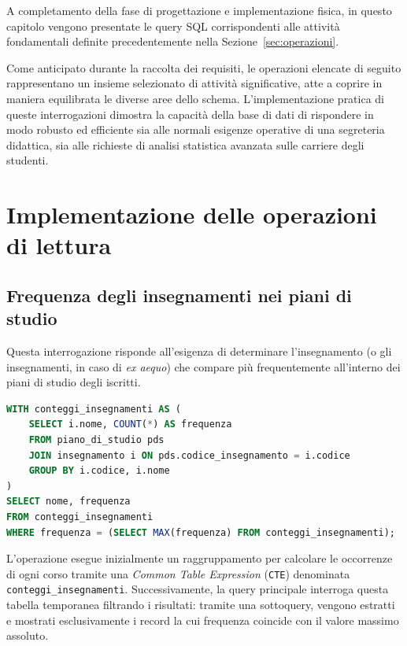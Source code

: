 A completamento della fase di progettazione e implementazione fisica, in questo capitolo vengono presentate le query SQL corrispondenti alle attività fondamentali definite precedentemente nella Sezione~\ref{sec:operazioni}.

Come anticipato durante la raccolta dei requisiti, le operazioni elencate di seguito rappresentano un insieme selezionato di attività significative, atte a coprire in maniera equilibrata le diverse aree dello schema.
L'implementazione pratica di queste interrogazioni dimostra la capacità della base di dati di rispondere in modo robusto ed efficiente sia alle normali esigenze operative di una segreteria didattica, sia alle richieste di analisi statistica avanzata sulle carriere degli studenti.

\section{Implementazione delle operazioni di lettura}
\label{sec:implementazione-delle-operazioni-di-lettura}

\subsection{Frequenza degli insegnamenti nei piani di studio}
\label{ssec:frequenza-degli-insegnamenti-nei-piani-di-studio}
Questa interrogazione risponde all'esigenza di determinare l'insegnamento (o gli insegnamenti, in caso di \textit{ex aequo}) che compare più frequentemente all'interno dei piani di studio degli iscritti.

\begin{lstlisting}[language=SQL]
WITH conteggi_insegnamenti AS (
    SELECT i.nome, COUNT(*) AS frequenza
    FROM piano_di_studio pds
    JOIN insegnamento i ON pds.codice_insegnamento = i.codice
    GROUP BY i.codice, i.nome
)
SELECT nome, frequenza
FROM conteggi_insegnamenti
WHERE frequenza = (SELECT MAX(frequenza) FROM conteggi_insegnamenti);
\end{lstlisting}

L'operazione esegue inizialmente un raggruppamento per calcolare le occorrenze di ogni corso tramite una \textit{Common Table Expression} (\texttt{CTE}) denominata \texttt{conteggi\_insegnamenti}.
Successivamente, la query principale interroga questa tabella temporanea filtrando i risultati: tramite una sottoquery, vengono estratti e mostrati esclusivamente i record la cui frequenza coincide con il valore massimo assoluto.


